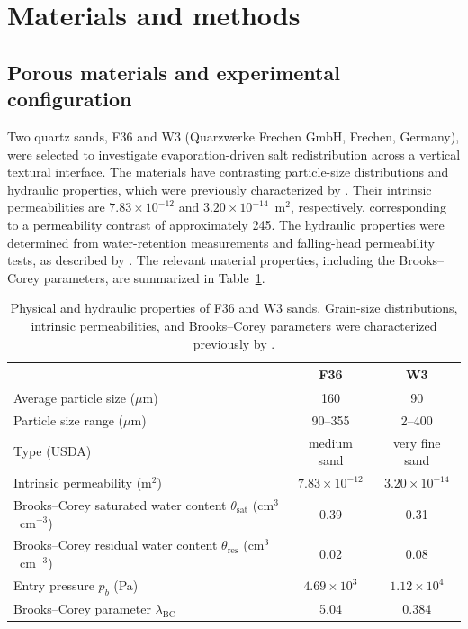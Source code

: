 \documentclass[final]{agujournal2019}
\begin{document}
\section{Materials and methods} \label{sec:methods}

\subsection{Porous materials and experimental configuration}
\label{sec:materials}

Two quartz sands, F36 and W3 (Quarzwerke Frechen GmbH, Frechen, Germany), were
selected to investigate evaporation-driven salt redistribution across a vertical
textural interface. The materials have contrasting particle-size distributions
and hydraulic properties, which were previously characterized by
. Their intrinsic permeabilities are
$7.83\times10^{-12}$ and $3.20\times10^{-14}$~m$^2$, respectively,
corresponding to a permeability contrast of approximately 245. The hydraulic
properties were determined from water-retention measurements and falling-head
permeability tests, as described by . The relevant material
properties, including the Brooks--Corey parameters, are summarized in
Table~\ref{tab:properties}.

\begin{table}[t]
\centering
\caption{Physical and hydraulic properties of F36 and W3 sands. Grain-size
distributions, intrinsic permeabilities, and Brooks--Corey parameters were
characterized previously by .}
\label{tab:properties}
\setlength{\tabcolsep}{4pt}%
\begin{tabular}{lcc}
\toprule
 & F36 & W3 \\
\midrule
Average particle size ($\mu$m)              & 160 & 90 \\
Particle size range ($\mu$m)                & 90--355 & 2--400 \\
Type (USDA)                                  & medium sand & very fine sand \\
Intrinsic permeability (m$^2$)              & $7.83\times10^{-12}$ & $3.20\times10^{-14}$ \\
Brooks--Corey saturated water content $\theta_{\mathrm{sat}}$ (cm$^3$~cm$^{-3}$)  & 0.39 & 0.31 \\
Brooks--Corey residual water content $\theta_{\mathrm{res}}$ (cm$^3$~cm$^{-3}$)   & 0.02 & 0.08 \\
Entry pressure $p_b$ (Pa)                    & $4.69\times10^{3}$ & $1.12\times10^{4}$ \\
Brooks--Corey parameter $\lambda_{\mathrm{BC}}$ & 5.04 & 0.384 \\
\bottomrule
\end{tabular}
\end{table}
\end{document}
